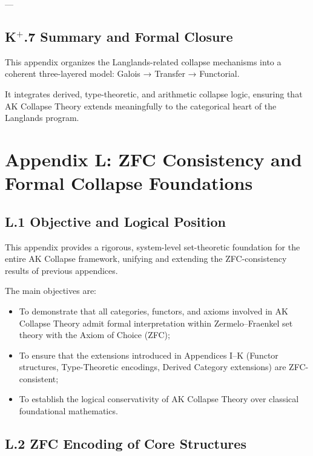 \documentclass[11pt]{article}
\begin{document}
---

\subsection*{K$^{+}$.7 Summary and Formal Closure}

This appendix organizes the Langlands-related collapse mechanisms into a coherent three-layered model: Galois → Transfer → Functorial.

It integrates derived, type-theoretic, and arithmetic collapse logic, ensuring that AK Collapse Theory extends meaningfully to the categorical heart of the Langlands program.



\section*{Appendix L: ZFC Consistency and Formal Collapse Foundations}

\subsection*{L.1 Objective and Logical Position}

This appendix provides a rigorous, system-level set-theoretic foundation for the entire AK Collapse framework, unifying and extending the ZFC-consistency results of previous appendices.

The main objectives are:

\begin{itemize}
    \item To demonstrate that all categories, functors, and axioms involved in AK Collapse Theory admit formal interpretation within Zermelo–Fraenkel set theory with the Axiom of Choice (ZFC);
    \item To ensure that the extensions introduced in Appendices I–K (Functor structures, Type-Theoretic encodings, Derived Category extensions) are ZFC-consistent;
    \item To establish the logical conservativity of AK Collapse Theory over classical foundational mathematics.
\end{itemize}

\subsection*{L.2 ZFC Encoding of Core Structures}
\end{document}
